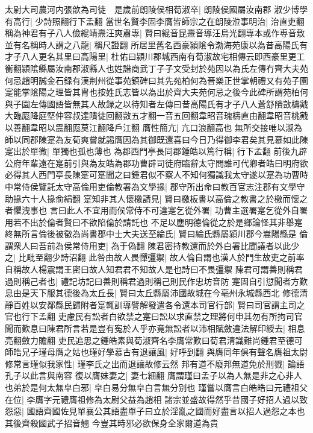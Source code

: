 太尉大司農河内張歆為司徒　是歲前朗陵侯相荀淑卒|{
	朗陵侯國屬汝南郡}
淑少博學有高行|{
	少詩照翻行下孟翻}
當世名賢李固李膺皆師宗之在朗陵涖事明治|{
	治直吏翻}
稱為神君有子八人儉緄靖燾汪爽肅專|{
	賢曰緄音昆燾音導汪烏光翻專本或作尃音敷}
並有名稱時人謂之八龍|{
	稱尺證翻}
所居里舊名西豪潁隂令渤海苑康以為昔高陽氏有才子八人更名其里曰高陽里|{
	杜佑曰潁川郡城西南有荀淑故宅相傳云即西豪里更工衡翻潁隂縣屬汝南郡淑縣人也姓譜商武丁子子文受封於苑因以為氏左傳冇齊大夫苑何忌趙明誠金石録有漢荆州從事苑鎮碑曰其先苑柏何為晉樂正世掌朝禮又有苑子園寔能掌隂陽之理皆其胄也按姓氏志皆以為出於齊大夫苑何忌之後今此碑所謂苑柏何與子園左傳國語皆無其人故録之以待知者左傳曰昔高陽氏有才子八人蒼舒隤敳檮戭大臨厖降庭堅仲容叔達隤徒回翻敳五才翻一音五回翻韋昭音瑰檮直由翻韋昭音桃戭以善翻韋昭以震翻厖莫江翻降戶江翻}
膺性簡亢|{
	亢口浪翻高也}
無所交接唯以淑為師以同郡陳寔為友荀爽嘗就謁膺因為其御既還喜曰今日乃得御李君矣其見慕如此陳寔出於單微|{
	單獨也孤也薄也}
為郡西門亭長同郡鍾皓以篤行稱|{
	行下孟翻}
前後九辟公府年輩遠在寔前引與為友皓為郡功曹辟司徒府臨辭太守問誰可代卿者皓曰明府欲必得其人西門亭長陳寔可寔聞之曰鍾君似不察人不知何獨識我太守遂以寔為功曹時中常侍侯覽託太守高倫用吏倫教署為文學掾|{
	郡守所出命曰教百官志注郡有文學守助掾六十人掾俞絹翻}
寔知非其人懷檄請見|{
	賢曰檄板書以高倫之教書之於檄而懷之者懼洩事也}
言曰此人不宜用而侯常侍不可違寔乞從外署|{
	功曹主選署寔乞從外自署用若不出於倫者賢曰不欲陷倫於請託也}
不足以塵明德倫從之於是鄉論怪其非舉寔終無所言倫後被徵為尚書郡中士大夫送至綸氏|{
	賢曰綸氏縣屬潁川郡今嵩陽縣是}
倫謂衆人曰吾前為侯常侍用吏|{
	為于偽翻}
陳君密持教還而於外白署比聞議者以此少之|{
	比毗至翻少詩沼翻}
此咎由故人畏憚彊禦|{
	故人倫自謂也漢人於門生故吏之前率自稱故人楊震謂王密曰故人知君君不知故人是也詩曰不畏彊禦}
陳君可謂善則稱君過則稱己者也|{
	禮記坊記曰善則稱君過則稱己則民作忠坊音防}
寔固自引愆聞者方歎息由是天下服其德後為太丘長|{
	賢曰太丘縣屬沛國故城在今亳州永城縣西北}
修德清靜百姓以安鄰縣民歸附者寔輒訓導譬解發遣各令還本司官行部|{
	賢曰司官謂主司之官也行下孟翻}
吏慮民有訟者白欲禁之寔曰訟以求直禁之理將何申其勿有所拘司官聞而歎息曰陳君所言若是豈有寃於人乎亦竟無訟者以沛相賦斂違法解印綬去|{
	相息亮翻斂力贍翻}
吏民追思之鍾皓素與荀淑齊名李膺常歎曰荀君清識難尚鍾君至德可師皓兄子瑾母膺之姑也瑾好學慕古有退讓風|{
	好呼到翻}
與膺同年俱有聲名膺祖太尉修常言瑾似我家性|{
	瑾李氏之出而退讓故修云然}
邦有道不廢邦無道免於刑戮|{
	論語孔子以此言與南容}
復以膺妹妻之|{
	妻七細翻}
膺謂瑾曰孟子以為人無是非之心非人也弟於是何太無皁白邪|{
	皁白易分無皁白言無分别也}
瑾嘗以膺言白皓皓曰元禮祖父在位|{
	李膺字元禮膺祖修為太尉父益為趙相}
諸宗並盛故得然乎昔國子好招人過以致怨惡|{
	國語齊國佐見單襄公其語盡單子曰立於淫亂之國而好盡言以招人過怨之本也其後齊殺國武子招音翹}
今豈其時邪必欲保身全家爾道為貴

